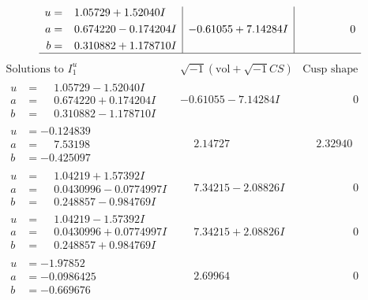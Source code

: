 \documentclass[1p]{elsarticle_modified}
\theoremstyle{definition}
\newcommand{\I}{\sqrt{-1}}
\begin{document}
$$\begin{array}{c|c|c}
\begin{aligned}
u &= \phantom{-}1.05729 + 1.52040 I \\
a &= \phantom{-}0.674220 - 0.174204 I \\
b &= \phantom{-}0.310882 + 1.178710 I\end{aligned}
 & -0.61055 + 7.14284 I & \phantom{-0.000000 } 0\\
 \hline 
 \end{array}$$\newpage$$\begin{array}{c|c|c}  
\text{Solutions to }I^u_{1}& \I (\text{vol} + \sqrt{-1}CS) & \text{Cusp shape}\\
 \hline 
\begin{aligned}
u &= \phantom{-}1.05729 - 1.52040 I \\
a &= \phantom{-}0.674220 + 0.174204 I \\
b &= \phantom{-}0.310882 - 1.178710 I\end{aligned}
 & -0.61055 - 7.14284 I & \phantom{-0.000000 } 0 \\ \hline\begin{aligned}
u &= -0.124839\phantom{ +0.000000I} \\
a &= \phantom{-}7.53198\phantom{ +0.000000I} \\
b &= -0.425097\phantom{ +0.000000I}\end{aligned}
 & \phantom{-}2.14727\phantom{ +0.000000I} & \phantom{-}2.32940\phantom{ +0.000000I} \\ \hline\begin{aligned}
u &= \phantom{-}1.04219 + 1.57392 I \\
a &= \phantom{-}0.0430996 - 0.0774997 I \\
b &= \phantom{-}0.248857 - 0.984769 I\end{aligned}
 & \phantom{-}7.34215 - 2.08826 I & \phantom{-0.000000 } 0 \\ \hline\begin{aligned}
u &= \phantom{-}1.04219 - 1.57392 I \\
a &= \phantom{-}0.0430996 + 0.0774997 I \\
b &= \phantom{-}0.248857 + 0.984769 I\end{aligned}
 & \phantom{-}7.34215 + 2.08826 I & \phantom{-0.000000 } 0 \\ \hline\begin{aligned}
u &= -1.97852\phantom{ +0.000000I} \\
a &= -0.0986425\phantom{ +0.000000I} \\
b &= -0.669676\phantom{ +0.000000I}\end{aligned}
 & \phantom{-}2.69964\phantom{ +0.000000I} & \phantom{-0.000000 } 0 \\ \hline\begin{aligned}

\end{aligned}
\end{array}$$
\end{document}
